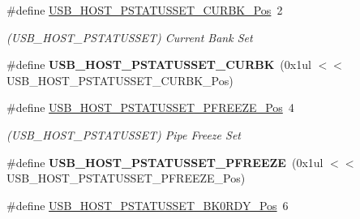 \begin{DoxyCompactItemize}
\item 
\hypertarget{group___s_a_m_l21___u_s_b_gaf1e75c2eb453896f239918b5fdbf1ba3}{}\#define \hyperlink{group___s_a_m_l21___u_s_b_gaf1e75c2eb453896f239918b5fdbf1ba3}{U\+S\+B\+\_\+\+H\+O\+S\+T\+\_\+\+P\+S\+T\+A\+T\+U\+S\+S\+E\+T\+\_\+\+C\+U\+R\+B\+K\+\_\+\+Pos}~2\label{group___s_a_m_l21___u_s_b_gaf1e75c2eb453896f239918b5fdbf1ba3}

\begin{DoxyCompactList}\small\item\em (U\+S\+B\+\_\+\+H\+O\+S\+T\+\_\+\+P\+S\+T\+A\+T\+U\+S\+S\+E\+T) Current Bank Set \end{DoxyCompactList}\item 
\hypertarget{group___s_a_m_l21___u_s_b_ga44066e0604fbf9210f36538b4fa7d87e}{}\#define {\bfseries U\+S\+B\+\_\+\+H\+O\+S\+T\+\_\+\+P\+S\+T\+A\+T\+U\+S\+S\+E\+T\+\_\+\+C\+U\+R\+B\+K}~(0x1ul $<$$<$ U\+S\+B\+\_\+\+H\+O\+S\+T\+\_\+\+P\+S\+T\+A\+T\+U\+S\+S\+E\+T\+\_\+\+C\+U\+R\+B\+K\+\_\+\+Pos)\label{group___s_a_m_l21___u_s_b_ga44066e0604fbf9210f36538b4fa7d87e}

\item 
\hypertarget{group___s_a_m_l21___u_s_b_gafbb2360e8ab98fa4471c59a16820a6e3}{}\#define \hyperlink{group___s_a_m_l21___u_s_b_gafbb2360e8ab98fa4471c59a16820a6e3}{U\+S\+B\+\_\+\+H\+O\+S\+T\+\_\+\+P\+S\+T\+A\+T\+U\+S\+S\+E\+T\+\_\+\+P\+F\+R\+E\+E\+Z\+E\+\_\+\+Pos}~4\label{group___s_a_m_l21___u_s_b_gafbb2360e8ab98fa4471c59a16820a6e3}

\begin{DoxyCompactList}\small\item\em (U\+S\+B\+\_\+\+H\+O\+S\+T\+\_\+\+P\+S\+T\+A\+T\+U\+S\+S\+E\+T) Pipe Freeze Set \end{DoxyCompactList}\item 
\hypertarget{group___s_a_m_l21___u_s_b_gaa676742f1440c11c232fc6c498b3809e}{}\#define {\bfseries U\+S\+B\+\_\+\+H\+O\+S\+T\+\_\+\+P\+S\+T\+A\+T\+U\+S\+S\+E\+T\+\_\+\+P\+F\+R\+E\+E\+Z\+E}~(0x1ul $<$$<$ U\+S\+B\+\_\+\+H\+O\+S\+T\+\_\+\+P\+S\+T\+A\+T\+U\+S\+S\+E\+T\+\_\+\+P\+F\+R\+E\+E\+Z\+E\+\_\+\+Pos)\label{group___s_a_m_l21___u_s_b_gaa676742f1440c11c232fc6c498b3809e}

\item 
\hypertarget{group___s_a_m_l21___u_s_b_gaec5a3bd2e701158f0f89951ad03376c0}{}\#define \hyperlink{group___s_a_m_l21___u_s_b_gaec5a3bd2e701158f0f89951ad03376c0}{U\+S\+B\+\_\+\+H\+O\+S\+T\+\_\+\+P\+S\+T\+A\+T\+U\+S\+S\+E\+T\+\_\+\+B\+K0\+R\+D\+Y\+\_\+\+Pos}~6\label{group___s_a_m_l21___u_s_b_gaec5a3bd2e701158f0f89951ad03376c0}


\end{DoxyCompactItemize}
